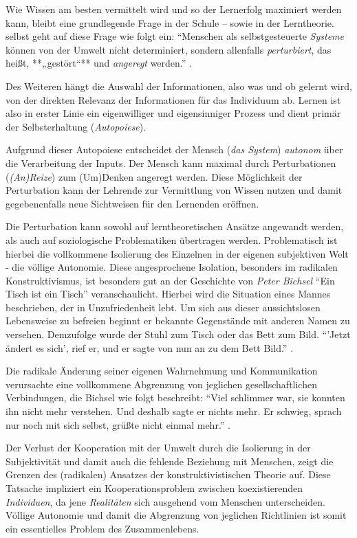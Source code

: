 Wie Wissen am besten vermittelt wird und so der Lernerfolg maximiert werden kann, bleibt eine grundlegende Frage in der Schule -- sowie in der Lerntheorie.
\citeauthor{siebert-2003}  selbst geht auf diese Frage wie folgt ein:
``Menschen als selbstgesteuerte \emph{Systeme} können von der Umwelt nicht determiniert, sondern allenfalls \emph{perturbiert}, das heißt, **„gestört“** und \emph{angeregt} werden.'' \parencite[vgl.][5]{siebert-2003}.

Des Weiteren hängt die Auswahl der Informationen, also was und ob gelernt wird, von der direkten Relevanz der Informationen für das Individuum ab.
Lernen ist also in erster Linie ein eigenwilliger und eigensinniger Prozess und dient primär der Selbsterhaltung (\emph{Autopoiese}).

Aufgrund dieser Autopoiese entscheidet der Mensch (\emph{das System}) \emph{autonom} über die Verarbeitung der Inputs.
Der Mensch kann maximal durch Perturbationen (\emph{(An)Reize}) zum (Um)Denken angeregt werden.
Diese Möglichkeit der Perturbation kann der Lehrende zur Vermittlung von Wissen nutzen und damit gegebenenfalls neue Sichtweisen für den Lernenden eröffnen.

Die Perturbation kann sowohl auf lerntheoretischen Ansätze angewandt werden, als auch auf soziologische Problematiken übertragen werden.
Problematisch ist hierbei die vollkommene Isolierung des Einzelnen in der eigenen subjektiven Welt - die völlige Autonomie.
Diese angesprochene Isolation, besonders im radikalen Konstruktivismus, ist besonders gut an der Geschichte von \emph{Peter Bichsel} ``Ein Tisch ist ein Tisch'' veranschaulicht.
Hierbei wird die Situation eines Mannes beschrieben, der in Unzufriedenheit lebt.
Um sich aus dieser aussichtslosen Lebensweise zu befreien beginnt er bekannte Gegenstände mit anderen Namen zu versehen.
Demzufolge wurde der Stuhl zum Tisch oder das Bett zum Bild.
``'Jetzt ändert es sich', rief er, und er sagte von nun an zu dem Bett Bild.'' \parencite[vgl.][18]{bichsel-1990}.

Die radikale Änderung seiner eigenen Wahrnehmung und Kommunikation verursachte eine vollkommene Abgrenzung von jeglichen gesellschaftlichen Verbindungen, die Bichsel wie folgt beschreibt:
``Viel schlimmer war, sie konnten ihn nicht mehr verstehen. Und deshalb sagte er nichts mehr. Er schwieg, sprach nur noch mit sich selbst, grüßte nicht einmal mehr.'' \parencite[vgl.][25]{bichsel-1990}.

Der Verlust der Kooperation mit der Umwelt durch die Isolierung in der Subjektivität und damit auch die fehlende Beziehung mit Menschen, zeigt die Grenzen des (radikalen) Ansatzes der konstruktivistischen Theorie auf.
Diese Tatsache impliziert ein Kooperationsproblem zwischen koexistierenden \emph{Individuen}, da jene \emph{Realitäten} sich ausgehend vom Menschen unterscheiden.
Völlige Autonomie und damit die Abgrenzung von jeglichen Richtlinien ist somit ein essentielles Problem des Zusammenlebens.
